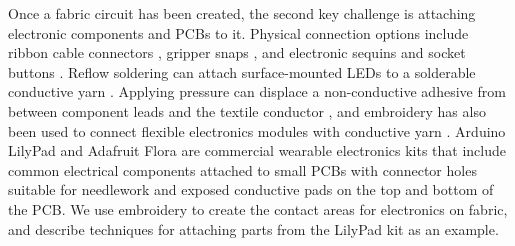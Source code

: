 Once a fabric circuit has been created, the second key challenge is attaching electronic components and PCBs to it.
Physical connection options include ribbon cable connectors \cite{lehn2004tags}, gripper snaps \cite{5387040}, and electronic sequins and socket buttons \cite{Buechley2009}. Reflow soldering can attach surface-mounted LEDs to a solderable conductive yarn \cite{Berglund:2015:SCA:2802083.2808413, Molla:2017:SME:3123021.3123058}. Applying pressure can displace a non-conductive adhesive from between component leads and the textile conductor \cite{linz2012contacting}, and embroidery has also been used to connect flexible electronics modules with conductive yarn \cite{linz2005embroidering}. Arduino LilyPad \cite{4487082} and Adafruit Flora are commercial wearable electronics kits that include common electrical components attached to small PCBs with connector holes suitable for needlework and exposed conductive pads on the top and bottom of the PCB. We use embroidery to create the contact areas for electronics on fabric, and describe techniques for attaching parts from the LilyPad kit as an example.


